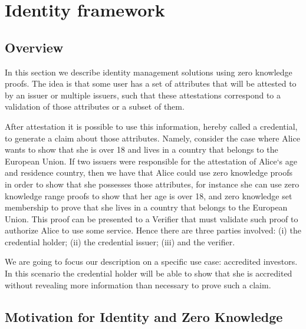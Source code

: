 \section{Identity framework}
\label{apps:id-framework}



\subsection{Overview}


In this section we describe identity management solutions using zero knowledge proofs. The idea is that some user has a set of attributes that will be attested to by an issuer or multiple issuers, such that these attestations correspond to a validation of those attributes or a subset of them. 


After attestation it is possible to use this information, hereby called a credential, to generate a claim about those attributes. Namely, consider the case where Alice wants to show that she is over 18 and lives in a country that belongs to the European Union. If two issuers were responsible for the attestation of Alice`s age and residence country, then we have that Alice could use zero knowledge proofs in order to show that she possesses those attributes, for instance she can use zero knowledge range proofs to show that her age is over 18, and zero knowledge set membership to prove that she lives in a country that belongs to the European Union. This proof can be presented to a Verifier that must validate such proof to authorize Alice to use some service. Hence there are three parties involved: (i) the credential holder; (ii) the credential issuer; (iii) and the verifier.  


We are going to focus our description on a specific use case: accredited investors. In this scenario the credential holder will be able to show that she is accredited without revealing more information than necessary to prove such a claim.   


\subsection{Motivation for Identity and Zero Knowledge}

